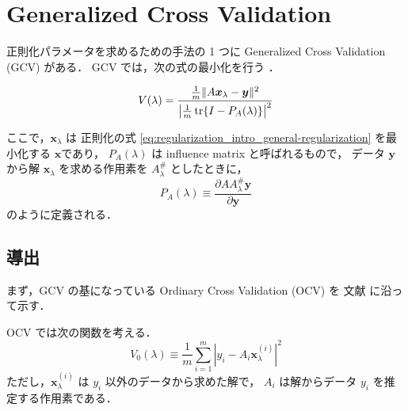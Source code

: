 %

\chapter{Generalized Cross Validation}

正則化パラメータを求めるための手法の 1 つに
Generalized Cross Validation (GCV) がある．
GCV では，次の式の最小化を行う
\cite{Wahba1990}．

\begin{equation}
    V(\lambda)
    = \frac{\frac{1}{m} \|A \bm{x}_\lambda - \bm{y}\|^2}
    {\left|\frac{1}{m} \operatorname{tr}\{I - P_A(\lambda)\}\right|^2}
    \label{eq:regularization_gcv_gdv-evaluation-function}
\end{equation}

ここで，$\bm{x}_\lambda$ は
正則化の式 \eqref{eq:regularization_intro_general-regularization} を最小化する
$\bm{x}$であり，
$P_A(\lambda)$ は influence matrix と呼ばれるもので，
データ $\bm{y}$ から解 $\bm{x}_\lambda$ を求める作用素を $A_\lambda^\#$ としたときに，
\begin{equation}
    P_A(\lambda) \equiv
    \frac{\partial A A_\lambda^\# \bm{y}}{\partial \bm{y}}
    \label{eq:regularization_gcv_influence-matrix}
\end{equation}
のように定義される．

\section{導出}

まず，GCV の基になっている Ordinary Cross Validation (OCV) を
文献 \cite{Wahba1990} に沿って示す．

OCV では次の関数を考える．
\begin{equation}
    V_0(\lambda) \equiv
    \frac{1}{m} \sum_{i=1}^m
    \left|y_i - A_i \bm{x}_\lambda^{(i)}\right|^2
    \label{eq:regularization_gcv_ocv-evaluation-function}
\end{equation}
ただし，$\bm{x}_\lambda^{(i)}$ は $y_i$ 以外のデータから求めた解で，
$A_i$ は解からデータ $y_i$ を推定する作用素である．


